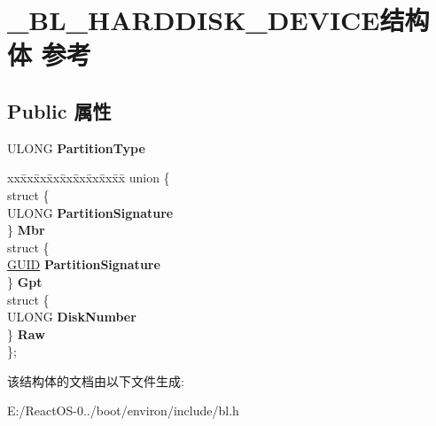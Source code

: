 \hypertarget{struct___b_l___h_a_r_d_d_i_s_k___d_e_v_i_c_e}{}\section{\+\_\+\+B\+L\+\_\+\+H\+A\+R\+D\+D\+I\+S\+K\+\_\+\+D\+E\+V\+I\+C\+E结构体 参考}
\label{struct___b_l___h_a_r_d_d_i_s_k___d_e_v_i_c_e}
\subsection*{Public 属性}
\begin{DoxyCompactItemize}
\item 
\mbox{\label{struct___b_l___h_a_r_d_d_i_s_k___d_e_v_i_c_e_a964a9470a29030e021ab1c87764f8529}} 
U\+L\+O\+NG {\bfseries Partition\+Type}
\item 
\mbox{\label{struct___b_l___h_a_r_d_d_i_s_k___d_e_v_i_c_e_a80bdb3c66274cb19d688579301faca40}} 
\begin{tabbing}
xx\=xx\=xx\=xx\=xx\=xx\=xx\=xx\=xx\=\kill
union \{\\
\>struct \{\\
\>\>ULONG {\bfseries PartitionSignature}\\
\>\} {\bfseries Mbr}\\
\>struct \{\\
\>\>\hyperlink{interface_g_u_i_d}{GUID} {\bfseries PartitionSignature}\\
\>\} {\bfseries Gpt}\\
\>struct \{\\
\>\>ULONG {\bfseries DiskNumber}\\
\>\} {\bfseries Raw}\\
\}; \\

\end{tabbing}\end{DoxyCompactItemize}


该结构体的文档由以下文件生成\+:\begin{DoxyCompactItemize}
\item 
E\+:/\+React\+O\+S-\/0../boot/environ/include/bl.\+h\end{DoxyCompactItemize}
